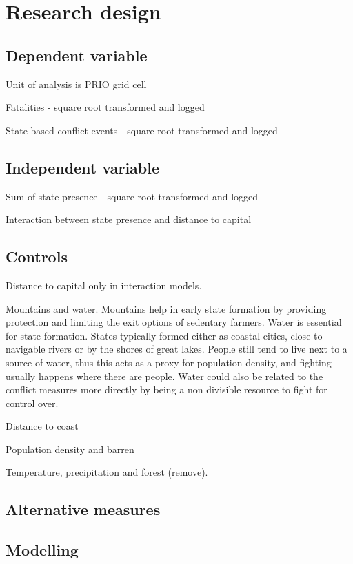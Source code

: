 \documentclass[12pt]{article}
\begin{document}
\section{Research design}

\subsection{Dependent variable}

Unit of analysis is PRIO grid cell 

Fatalities - square root transformed and logged

State based conflict events - square root transformed and logged

\subsection{Independent variable}

Sum of state presence - square root transformed and logged

Interaction between state presence and distance to capital

\subsection{Controls}

Distance to capital only in interaction models.

Mountains and water. Mountains help in early state formation by providing
protection and limiting the exit options of sedentary farmers. Water is
essential for state formation. States typically formed either as coastal cities,
close to navigable rivers or by the shores of great lakes. People still tend to
live next to a source of water, thus this acts as a proxy for population
density, and fighting usually happens where there are people. Water could also
be related to the conflict measures more directly by being a non divisible
resource to fight for control over.

Distance to coast

Population density and barren

Temperature, precipitation and forest (remove).

\subsection{Alternative measures}

\subsection{Modelling}
\end{document}
